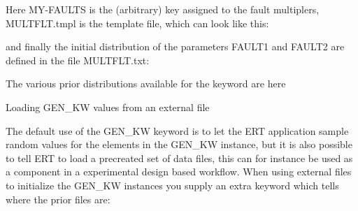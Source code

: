 \documentclass[a4paper,10pt,english]{sphinxmanual}
\begin{document}
\begin{sphinxShadowBox}
%
\begin{sphinxVerbatim}[commandchars=\\\{\}]
           
\end{sphinxVerbatim}

Here MY-FAULTS is the (arbitrary) key assigned to the fault multiplers,
MULTFLT.tmpl is the template file, which can look like this:

%
\begin{sphinxVerbatim}[commandchars=\\\{\}]
      
      
\end{sphinxVerbatim}

and finally the initial distribution of the parameters FAULT1 and FAULT2 are
defined in the file MULTFLT.txt:

%
\begin{sphinxVerbatim}[commandchars=\\\{\}]
         
            
\end{sphinxVerbatim}

The various prior distributions available for the 
keyword are here 

Loading GEN\_KW values from an external file

The default use of the GEN\_KW keyword is to let the ERT application sample
random values for the elements in the GEN\_KW instance, but it is also possible
to tell ERT to load a precreated set of data files, this can for instance be
used as a component in a experimental design based workflow. When using
external files to initialize the GEN\_KW instances you supply an extra keyword
 which tells where the prior files are:

%
\begin{sphinxVerbatim}[commandchars=\\\{\}]
               
\end{sphinxVerbatim}


\end{sphinxShadowBox}
\end{document}
